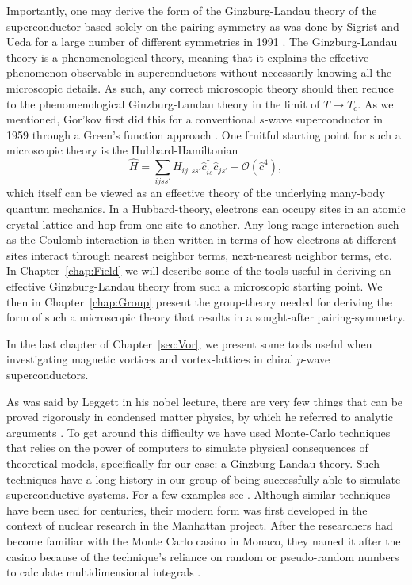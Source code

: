 Importantly, one may derive the form of the Ginzburg-Landau theory of the superconductor based solely on the pairing-symmetry as was done by Sigrist and Ueda
for a large number of different symmetries in 1991 \cite{SigristUeda91}. The Ginzburg-Landau theory is a
phenomenological theory, meaning that it explains the effective phenomenon observable in superconductors without necessarily knowing all the microscopic
details. As such, any correct microscopic theory should then reduce to the phenomenological Ginzburg-Landau theory in the limit of $T\to T_c$. As we mentioned,
Gor'kov first did this for a conventional $s$-wave superconductor in 1959 through a Green's function approach \cite{Gorkov59}. One fruitful
starting point for such a microscopic theory is the Hubbard-Hamiltonian
\begin{equation}
    \label{eq:Intro:HubbardHamiltonian}
    \hat{H} = \sum_{ijss'}H_{ij;ss'}\hat{c}_{is}^\dagger\hat{c}_{js'} + \mathcal{O}(\hat{c}^4),
\end{equation}
which itself can be viewed as an effective theory of the underlying many-body
quantum mechanics. In a Hubbard-theory, electrons can occupy sites in an atomic crystal lattice and hop from one site to another. Any long-range interaction
such as the Coulomb interaction is then written in terms
of how electrons at different sites interact through nearest neighbor terms, next-nearest neighbor terms, etc. In Chapter~\ref{chap:Field} we will describe some of the
tools useful in deriving an effective Ginzburg-Landau theory from such a microscopic starting point. We then in Chapter~\ref{chap:Group} present the
group-theory needed for deriving the form of such a microscopic theory that results in a sought-after pairing-symmetry.

In the last chapter of Chapter~\ref{sec:Vor}, we present some tools useful when investigating magnetic vortices and vortex-lattices in chiral $p$-wave
superconductors.

As was said by Leggett in his nobel lecture, there are very few things that can be proved rigorously in condensed matter physics, by which he referred to analytic
arguments \cite{Leggett03}. To get around this difficulty we have used Monte-Carlo techniques that relies on the power of computers to simulate physical
consequences of theoretical models, specifically for our case: a Ginzburg-Landau theory. Such techniques have a long history in our group of being successfully
able to simulate superconductive systems. For a few examples see \cite{Nguyen99PRB, Smiseth05, Smorgrav05, Bojesen14, Galteland15}. Although similar techniques
have been used for centuries, their modern form
was first developed in the context of nuclear research in the Manhattan project. After the researchers had become familiar with the Monte Carlo casino in Monaco,
they named it after the casino because of the technique's reliance on random or pseudo-random numbers to
calculate multidimensional integrals \cite{Metropolis87}.

